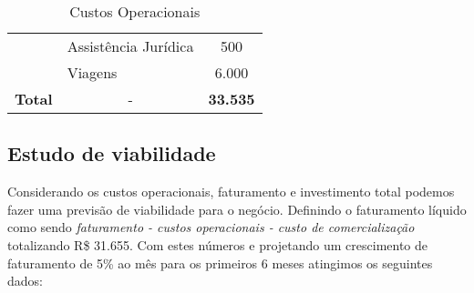 \begin{table}[h]
{\begin{tabular}{|l|l|c|}
		& Assistência Jurídica                                                             & 500         \\ \cline{2-3} 
		& Viagens                                                                          & 6.000      \\ \hline
		\multicolumn{1}{|c|}{\textbf{Total}}                                                                        & \multicolumn{1}{c|}{-}                                                           & \textbf{33.535}     \\ \hline
	\end{tabular}
	}
	\caption{Custos Operacionais}
	\label{custoOperacional}
\end{table}

\subsection{Estudo de viabilidade}

Considerando os custos operacionais, faturamento e investimento total podemos fazer uma previsão de viabilidade para o negócio. Definindo o faturamento líquido como sendo \emph{faturamento - custos operacionais - custo de comercialização} totalizando R\$ 31.655. Com estes números e projetando um crescimento de faturamento de 5\% ao mês para os primeiros 6 meses atingimos os seguintes dados:

